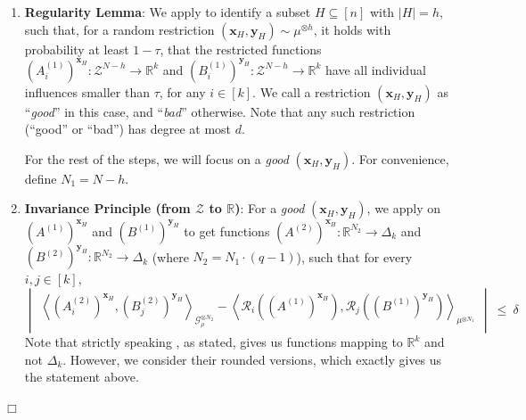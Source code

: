 \documentclass[11pt]{article}
\newcommand{\inparen}[1]{\left ( #1 \right )}
\newcommand{\inangle}[1]{\left \langle #1 \right \rangle}
\newcommand{\inabs}[1]{\begin{vmatrix} #1 \end{vmatrix}}
\DeclareMathOperator*{\Ex}{\mathbb{E}}
\newcommand{\eps}{\varepsilon}
\newcommand{\bbR}{{\mathbb R}}
\newcommand{\bx}{{\bm x}}
\newcommand{\by}{{\bm y}}
\newcommand{\calG}{\mathcal{G}}
\newcommand{\calR}{\mathcal{R}}
\newcommand{\calZ}{\mathcal{Z}}
\newenvironment{proofof}[1]{\noindent {\em Proof of #1.} \hspace*{1mm}}{\hfill $\Box$}
\begin{document}
\begin{proofof}{\Cref{thm:non-int-sim}}
\begin{enumerate}
	\item {\bf Regularity Lemma}:  We apply  to identify a subset $H \subseteq [n]$ with $|H| = h$, such that, for a random restriction $(\bx_H, \by_H) \sim \mu^{\otimes h}$, it holds with probability at least $1-\tau$, that the restricted functions $(A^{(1)}_i)^{\bx_H} : \calZ^{N-h} \to \bbR^k$ and $(B^{(1)}_i)^{\by_H} : \calZ^{N-h} \to \bbR^k$ have all individual influences smaller than $\tau$, for any $i \in [k]$. We call a restriction $(\bx_H, \by_H)$ as ``{\em good}'' in this case, and ``{\em bad}'' otherwise. Note that any such restriction (``good'' or ``bad'') has degree at most $d$.
	
	For the rest of the steps, we will focus on a {\em good} $(\bx_H, \by_H)$. For convenience, define $N_1 = N-h$.
	
	\item {\bf Invariance Principle (from $\calZ$ to $\bbR$)}: For a {\em good} $(\bx_H, \by_H)$, we apply  on $(A^{(1)})^{\bx_H}$ and $(B^{(1)})^{\by_H}$ to get functions $(A^{(2)})^{\bx_H} : \bbR^{N_2} \to \Delta_k$ and $(B^{(2)})^{\by_H} : \bbR^{N_2} \to \Delta_k$ (where $N_2 = N_1 \cdot (q-1)$), such that for every $i, j \in [k]$,
	\begin{equation}
		\inabs{\inangle{(A^{(2)}_i)^{\bx_H}, (B^{(2)}_j)^{\by_H}}_{\calG_\rho^{\otimes N_2}} - \inangle{\calR_i\inparen{(A^{(1)})^{\bx_H}}, \calR_j\inparen{(B^{(1)})^{\by_H}}}_{\mu^{\otimes N_1}}} ~\le~ \delta \label{eqn:NIS-2}
	\end{equation}
	Note that strictly speaking , as stated, gives us functions mapping to $\bbR^k$ and not $\Delta_k$. However, we consider their rounded versions, which exactly gives us the statement above.
	

\end{enumerate}
\end{proofof}
\end{document}
